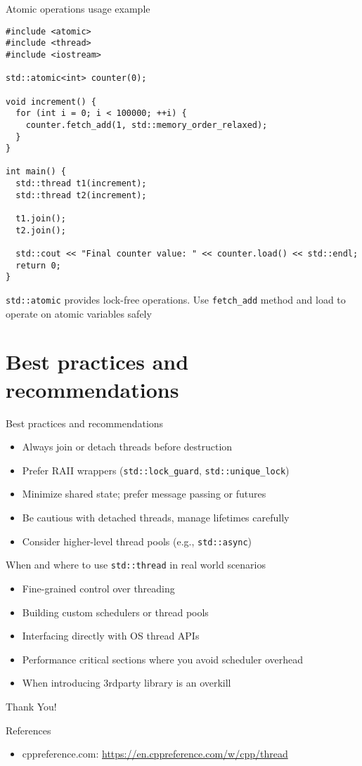 \documentclass{beamer}
\begin{document}
\begin{frame}[fragile]{Atomic operations usage example}
  \lstset{style=CStyle}
  \begin{lstlisting}
#include <atomic>
#include <thread>
#include <iostream>

std::atomic<int> counter(0);

void increment() {
  for (int i = 0; i < 100000; ++i) {
    counter.fetch_add(1, std::memory_order_relaxed);
  }
}

int main() {
  std::thread t1(increment);
  std::thread t2(increment);

  t1.join();
  t2.join();

  std::cout << "Final counter value: " << counter.load() << std::endl;
  return 0;
}
  \end{lstlisting}
  \texttt{std::atomic} provides lock-free operations. Use \texttt{fetch\_add} method and load to operate on atomic variables safely
\end{frame}

\section{Best practices and recommendations}

\begin{frame}{Best practices and recommendations}
  \begin{itemize}
    \item Always join or detach threads before destruction
    \item Prefer RAII wrappers (\texttt{std::lock\_guard}, \texttt{std::unique\_lock})
    \item Minimize shared state; prefer message passing or futures
    \item Be cautious with detached threads, manage lifetimes carefully
    \item Consider higher-level thread pools (e.g., \texttt{std::async})
  \end{itemize}
\end{frame}

\begin{frame}{When and where to use \texttt{std::thread} in real world scenarios}
  \begin{itemize}
    \item Fine-grained control over threading
    \item Building custom schedulers or thread pools
    \item Interfacing directly with OS thread APIs
    \item Performance critical sections where you avoid scheduler overhead
    \item When introducing 3rdparty library is an overkill
  \end{itemize}
\end{frame}

\begin{frame}
  \centering
  \Huge{Thank You!}
\end{frame}

\begin{frame}{References}
  \begin{itemize}
    \item cppreference.com: \url{https://en.cppreference.com/w/cpp/thread}
  \end{itemize}
\end{frame}
\end{document}
